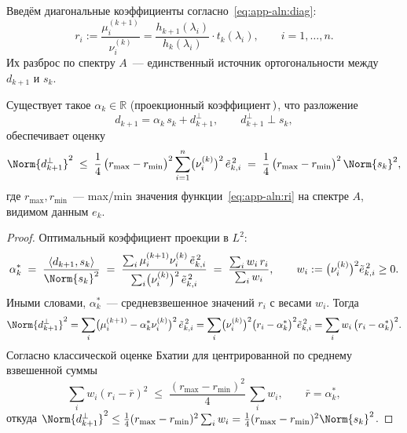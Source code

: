 Введём диагональные коэффициенты согласно~\eqref{eq:app-aln:diag}:
\begin{equation}
r_i := \frac{\mu_i^{(k+1)}}{\nu_i^{(k)}}
     = \frac{h_{k+1}(\lambda_i)}{h_k(\lambda_i)} \cdot t_k(\lambda_i),
\qquad i = 1, \ldots, n.
\label{eq:app-aln:ri}
\end{equation}
Их разброс по спектру $A$~--- единственный источник ортогональности
между $d_{k+1}$ и $s_k$.

\begin{lemma}
\label{lem:app-aln:proj}
Существует такое $\alpha_k \in \mathbb{R}$ \textup{(}проекционный
коэффициент$\,\textup{)}$, что разложение
\[
d_{k+1} = \alpha_k\, s_k + d_{k+1}^{\perp},
\qquad d_{k+1}^{\perp} \perp s_k,
\]
обеспечивает оценку
\begin{equation}
\Norm{d_{k+1}^{\perp}}^2
\;\le\;
\frac{1}{4}\,\bigl(r_{\max} - r_{\min}\bigr)^{2}
\sum_{i=1}^{n} \bigl(\nu_i^{(k)}\bigr)^{2}\, \tilde e_{k, i}^{\,2}
\;=\;
\frac{1}{4}\,\bigl(r_{\max} - r_{\min}\bigr)^{2}\,\Norm{s_k}^{2},
\label{eq:app-aln:perp-bound}
\end{equation}
где $r_{\max}, r_{\min}$~--- max/min значения функции~\eqref{eq:app-aln:ri}
на спектре $A$, видимом данным $e_k$.
\end{lemma}

\begin{proof}
Оптимальный коэффициент проекции в $L^2$:
\[
\alpha_k^{*} \;=\; \frac{\langle d_{k+1}, s_k \rangle}{\Norm{s_k}^{2}}
\;=\; \frac{\sum_i \mu_i^{(k+1)}\nu_i^{(k)}\, \tilde e_{k,i}^{\,2}}
        {\sum_i \bigl(\nu_i^{(k)}\bigr)^2\, \tilde e_{k,i}^{\,2}}
\;=\; \frac{\sum_i w_i\, r_i}{\sum_i w_i},
\qquad
w_i := \bigl(\nu_i^{(k)}\bigr)^2 \tilde e_{k,i}^{\,2} \ge 0.
\]
Иными словами, $\alpha_k^{*}$~--- средневзвешенное значений $r_i$ с весами $w_i$.
Тогда
\[
\Norm{d_{k+1}^{\perp}}^{2}
= \sum_i \bigl(\mu_i^{(k+1)} - \alpha_k^{*} \nu_i^{(k)}\bigr)^{2}\, \tilde e_{k,i}^{\,2}
= \sum_i \bigl(\nu_i^{(k)}\bigr)^{2} \bigl(r_i - \alpha_k^{*}\bigr)^{2} \tilde e_{k,i}^{\,2}
= \sum_i w_i\, \bigl(r_i - \alpha_k^{*}\bigr)^{2}.
\]
Согласно классической оценке Бхатии для центрированной по среднему
взвешенной суммы~\cite[Eq.~(2.2)]{Bhatia2000VarianceBound}
\[
\sum_i w_i (r_i - \bar r)^{2} \;\le\; \frac{(r_{\max} - r_{\min})^{2}}{4}\,\sum_i w_i,
\qquad \bar r = \alpha_k^{*},
\]
откуда
$\Norm{d_{k+1}^{\perp}}^{2}
\le \tfrac{1}{4}(r_{\max}-r_{\min})^{2}\sum_i w_i
= \tfrac{1}{4}(r_{\max}-r_{\min})^{2}\Norm{s_k}^{2}$.
\end{proof}

